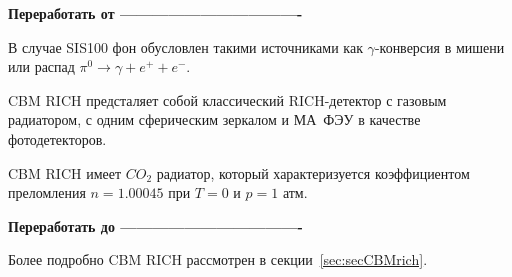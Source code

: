\textbf{Переработать от ----------------------------------}

В случае SIS100 фон обусловлен такими источниками как $\gamma$-конверсия в мишени или распад $\pi^{0} \rightarrow \gamma + e^{+} + e^{-}$.

CBM RICH предсталяет собой классический RICH-детектор с газовым радиатором, с одним сферическим зеркалом и МА~ФЭУ в качестве фотодетекторов.

CBM RICH имеет $CO_{2}$ радиатор, который характеризуется коэффициентом преломления $n=1.00045$ при $T=0$ и $p=1$ атм.

\textbf{Переработать до ----------------------------------}

Более подробно CBM RICH рассмотрен в секции~\ref{sec:secCBMrich}.

